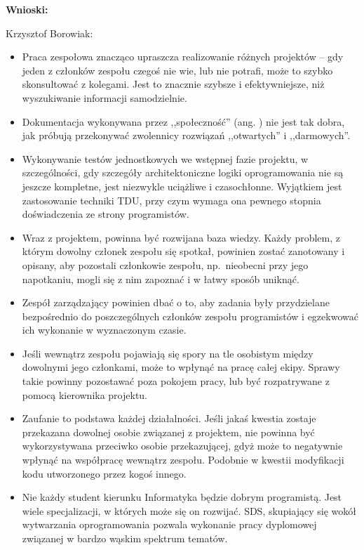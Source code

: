 \textbf{Wnioski:}
\begin{description}
\item Krzysztof Borowiak:
\begin{itemize}
\item Praca zespołowa znacząco upraszcza realizowanie różnych projektów -- gdy jeden z członków zespołu czegoś nie wie, lub nie potrafi, może to szybko skonsultować z kolegami. Jest to znacznie szybsze i efektywniejsze, niż wyszukiwanie informacji samodzielnie.
\item Dokumentacja wykonywana przez ,,społeczność'' (ang. ) nie jest tak dobra, jak próbują przekonywać zwolennicy rozwiązań ,,otwartych'' i ,,darmowych''.
\item Wykonywanie testów jednostkowych we wstępnej fazie projektu, w szczególności, gdy szczegóły architektoniczne logiki oprogramowania nie są jeszcze kompletne, jest niezwykle uciążliwe i czasochłonne. Wyjątkiem jest zastosowanie techniki TDU, przy czym wymaga ona pewnego stopnia doświadczenia ze strony programistów.
\item Wraz z projektem, powinna być rozwijana baza wiedzy. Każdy problem, z którym dowolny członek zespołu się spotkał, powinien zostać zanotowany i opisany, aby pozostali członkowie zespołu, np.~nieobecni przy jego napotkaniu, mogli się z nim zapoznać i w łatwy sposób uniknąć.
\item Zespół zarządzający powinien dbać o to, aby zadania były przydzielane bezpośrednio do poszczególnych członków zespołu programistów i egzekwować ich wykonanie w wyznaczonym czasie.
\item Jeśli wewnątrz zespołu pojawiają się spory na tle osobistym między dowolnymi jego członkami, może to wpłynąć na pracę całej ekipy. Sprawy takie powinny pozostawać poza pokojem pracy, lub być rozpatrywane z pomocą kierownika projektu.
\item Zaufanie to podstawa każdej działalności. Jeśli jakaś kwestia zostaje przekazana dowolnej osobie związanej z projektem, nie powinna być wykorzystywana przeciwko osobie przekazującej, gdyż może to negatywnie wpłynąć na współpracę wewnątrz zespołu. Podobnie w kwestii modyfikacji kodu utworzonego przez kogoś innego.
\item Nie każdy student kierunku Informatyka będzie dobrym programistą. Jest wiele specjalizacji, w których może się on rozwijać. SDS, skupiający się wokół wytwarzania oprogramowania pozwala wykonanie pracy dyplomowej związanej w bardzo wąskim spektrum tematów.
\end{itemize}

\end{description}
